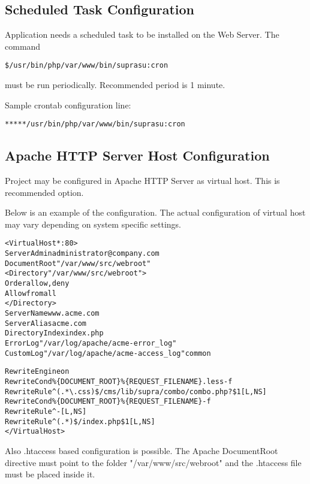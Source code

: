 \documentclass[12pt]{article}
\newcommand{\vigPathToProject}{/var/www}
\newcommand{\vigPathToSrc}{/src}
\newcommand{\vigPathToWebroot}{\vigPathToSrc/webroot}
\begin{document}
\subsection{Scheduled Task Configuration}

Application needs a scheduled task to be installed on the Web Server. The command

\begin{alltt}
\$ /usr/bin/php \vigPathToProject/bin/supra su:cron
\end{alltt}

must be run periodically. Recommended period is 1 minute.

Sample \textsf{crontab} configuration line:

\begin{alltt}
* * * * * /usr/bin/php \vigPathToProject/bin/supra su:cron
\end{alltt}

\subsection{Apache HTTP Server Host Configuration}

Project may be configured in Apache HTTP Server as virtual host. This is recommended option.

Below is an example of the configuration. The actual configuration of virtual host may vary depending on system specific settings.

\begin{alltt}
<VirtualHost *:80>
  ServerAdmin administrator@company.com
  DocumentRoot "\vigPathToProject\vigPathToWebroot"
  <Directory "\vigPathToProject\vigPathToWebroot">
    Order allow,deny
    Allow from all
  </Directory>
  ServerName www.acme.com
  ServerAlias acme.com
  DirectoryIndex index.php
  ErrorLog "/var/log/apache/acme-error\_log"
  CustomLog "/var/log/apache/acme-access\_log" common

  RewriteEngine on
  RewriteCond \%\{DOCUMENT_ROOT\}\%\{REQUEST_FILENAME\}.less -f
  RewriteRule ^(.*\textbackslash.css)\$ /cms/lib/supra/combo/combo.php?\$1 [L,NS]  
  RewriteCond \%\{DOCUMENT_ROOT\}\%\{REQUEST_FILENAME\} -f
  RewriteRule ^ - [L,NS]
  RewriteRule ^(.*)\$ /index.php\$1 [L,NS]
</VirtualHost>
\end{alltt}

Also .htaccess based configuration is possible. The Apache DocumentRoot directive must point to the folder "\vigPathToProject\vigPathToWebroot" and the .htaccess file must be placed inside it.
\end{document}
